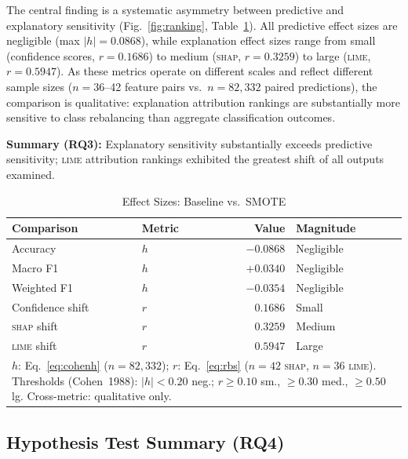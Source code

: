 \documentclass[conference,a4paper]{IEEEtran}
\newcommand{\SHAP}{\textsc{shap}\xspace}
\newcommand{\LIME}{\textsc{lime}\xspace}
\newcommand{\SMOTE}{SMOTE\xspace}
\begin{document}
The central finding is a systematic asymmetry between predictive and explanatory
sensitivity (Fig.~\ref{fig:ranking}, Table~\ref{tab:effect}). All predictive
effect sizes are negligible (max $|h|=0.0868$), while explanation effect sizes
range from small (confidence scores, $r=0.1686$) to medium (\SHAP, $r=0.3259$)
to large (\LIME, $r=0.5947$). As these metrics operate on different scales and
reflect different sample sizes ($n=36$--42 feature pairs vs.\ $n=82{,}332$
paired predictions), the comparison is qualitative: explanation attribution
rankings are substantially more sensitive to class rebalancing than aggregate
classification outcomes.

\smallskip
\noindent\textbf{Summary (RQ3):} Explanatory sensitivity substantially exceeds
predictive sensitivity; \LIME attribution rankings exhibited the greatest shift
of all outputs examined.

\begin{table}[tb]
  \caption{Effect Sizes: Baseline vs.\ \SMOTE}
  \label{tab:effect}
  \centering
  \setlength{\tabcolsep}{4pt}
  \renewcommand{\arraystretch}{0.75}
  \begin{tabular}{llrl}
    \toprule
    \textbf{Comparison} & \textbf{Metric} & \textbf{Value} & \textbf{Magnitude} \\
    \midrule
    Accuracy         & $h$ & $-0.0868$ & Negligible \\
    Macro F1         & $h$ & $+0.0340$ & Negligible \\
    Weighted F1      & $h$ & $-0.0354$ & Negligible \\
    Confidence shift & $r$ & $0.1686$  & Small \\
    \SHAP shift      & $r$ & $0.3259$  & Medium \\
    \LIME shift      & $r$ & $0.5947$  & Large \\
    \bottomrule
    \multicolumn{4}{p{\linewidth}}{\footnotesize $h$: Eq.~\eqref{eq:cohenh} ($n=82{,}332$);
      $r$: Eq.~\eqref{eq:rbs} ($n=42$ \SHAP, $n=36$ \LIME).
      Thresholds (Cohen~1988): $|h|{<}0.20$ neg.; $r{\geq}0.10$ sm.,
      ${\geq}0.30$ med., ${\geq}0.50$ lg. Cross-metric: qualitative only.}\\
  \end{tabular}
\end{table}

\subsection{Hypothesis Test Summary (RQ4)}
\end{document}
